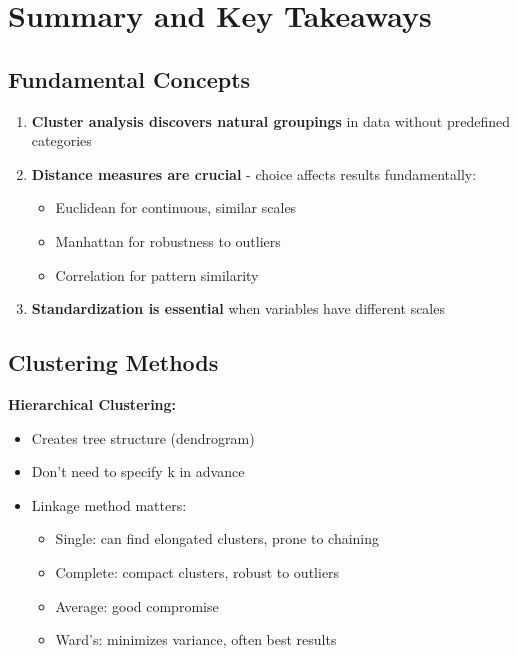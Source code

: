 \documentclass[
]{article}
\begin{document}
\section{Summary and Key Takeaways}

\textbf{ }

\subsection{Fundamental Concepts}

\begin{enumerate}
\item
  \textbf{Cluster analysis discovers natural groupings} in data without
  predefined categories
\item
  \textbf{Distance measures are crucial} - choice affects results
  fundamentally:

  \begin{itemize}
  \item
    Euclidean for continuous, similar scales
  \item
    Manhattan for robustness to outliers
  \item
    Correlation for pattern similarity
  \end{itemize}
\item
  \textbf{Standardization is essential} when variables have different
  scales
\end{enumerate}

\textbf{ }

\subsection{Clustering Methods}

\textbf{Hierarchical Clustering:}

\begin{itemize}
\item
  Creates tree structure (dendrogram)
\item
  Don't need to specify k in advance
\item
  Linkage method matters:

  \begin{itemize}
  \item
    Single: can find elongated clusters, prone to chaining
  \item
    Complete: compact clusters, robust to outliers
  \item
    Average: good compromise
  \item
    Ward's: minimizes variance, often best results
  \end{itemize}
\end{itemize}
\end{document}
